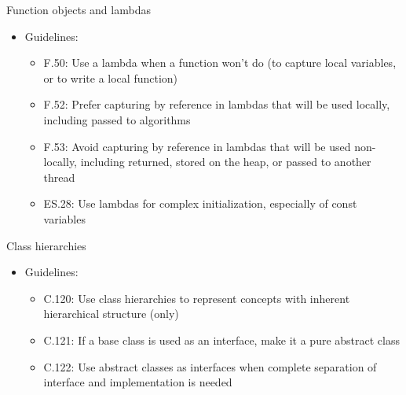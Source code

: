\begin{frame}[t]{Function objects and lambdas}
\begin{itemize}
  \item Guidelines:
    \begin{itemize}
      \item F.50: Use a lambda when a function won’t do (to capture local variables, or to write a local function)
      \item F.52: Prefer capturing by reference in lambdas that will be used locally, including passed to algorithms
      \item F.53: Avoid capturing by reference in lambdas that will be used non-locally, including returned, stored on the heap, or passed to another thread
      \item ES.28: Use lambdas for complex initialization, especially of const variables
    \end{itemize}
\end{itemize}
\end{frame}

\begin{frame}[t]{Class hierarchies}
\begin{itemize}
  \item Guidelines:
    \begin{itemize}
      \item C.120: Use class hierarchies to represent concepts with inherent hierarchical structure (only)
      \item C.121: If a base class is used as an interface, make it a pure abstract class
      \item C.122: Use abstract classes as interfaces when complete separation of interface and implementation is needed
    \end{itemize}
\end{itemize}
\end{frame}


